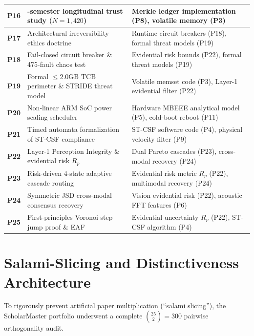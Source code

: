 \documentclass[11pt,letterpaper]{article}
\begin{document}
\begin{longtable}{>{\centering\sloppy\arraybackslash}p{1.2cm}>{\raggedright\sloppy\arraybackslash}p{5.8cm}>{\raggedright\sloppy\arraybackslash}p{8.0cm}}
\textbf{P16} & 3-semester longitudinal trust study ($N=1,420$) & Merkle ledger implementation (P8), volatile memory (P3) \\ \midrule
\textbf{P17} & Architectural irreversibility ethics doctrine & Runtime circuit breakers (P18), formal threat models (P19) \\ \midrule
\textbf{P18} & Fail-closed circuit breaker \& 475-fault chaos test & Evidential risk bounds (P22), formal threat models (P19) \\ \midrule
\textbf{P19} & Formal $\le 2.0\text{GB}$ TCB perimeter \& STRIDE threat model & Volatile memset code (P3), Layer-1 evidential filter (P22) \\ \midrule
\textbf{P20} & Non-linear ARM SoC power scaling scheduler & Hardware MBEEE analytical model (P5), cold-boot reboot (P11) \\ \midrule
\textbf{P21} & Timed automata formalization of ST-CSF compliance & ST-CSF software code (P4), physical velocity filter (P9) \\ \midrule
\textbf{P22} & Layer-1 Perception Integrity \& evidential risk $R_p$ & Dual Pareto cascades (P23), cross-modal recovery (P24) \\ \midrule
\textbf{P23} & Risk-driven 4-state adaptive cascade routing & Evidential risk metric $R_p$ (P22), multimodal recovery (P24) \\ \midrule
\textbf{P24} & Symmetric JSD cross-modal consensus recovery & Vision evidential risk (P22), acoustic FFT features (P6) \\ \midrule
\textbf{P25} & First-principles Voronoi step jump proof \& EAF & Evidential uncertainty $R_p$ (P22), ST-CSF algorithm (P4) \\
\end{longtable}

\section{Salami-Slicing and Distinctiveness Architecture}

To rigorously prevent artificial paper multiplication (``salami slicing''), the ScholarMaster portfolio underwent a complete $\binom{25}{2} = 300$ pairwise orthogonality audit. 
\end{document}
